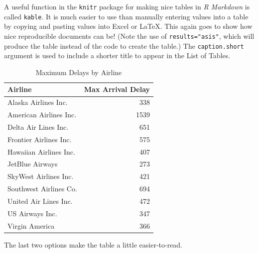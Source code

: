 \documentclass[12pt,twoside]{reedthesis}
\theoremstyle{definition}
\theoremstyle{definition}
\theoremstyle{remark}
\begin{document}
  A useful function in the \texttt{knitr} package for making nice tables
  in \emph{R Markdown} is called \texttt{kable}. It is much easier to use
  than manually entering values into a table by copying and pasting values
  into Excel or LaTeX. This again goes to show how nice reproducible
  documents can be! (Note the use of \texttt{results="asis"}, which will
  produce the table instead of the code to create the table.) The
  \texttt{caption.short} argument is used to include a shorter title to
  appear in the List of Tables.
  
  \begin{Shaded}
  \begin{Highlighting}[]
         \NormalTok{(}\NormalTok{, }\NormalTok{),}
         \NormalTok{,}
         \NormalTok{,}
         \NormalTok{,}
         \NormalTok{)}
  \end{Highlighting}
  \end{Shaded}
  
  \begin{longtable}[t]{lr}
  \caption[Max Delays by Airline]{\label{tab:maxdelays}Maximum Delays by Airline}\\
  \toprule
  Airline & Max Arrival Delay\\
  \midrule
  Alaska Airlines Inc. & 338\\
  American Airlines Inc. & 1539\\
  Delta Air Lines Inc. & 651\\
  Frontier Airlines Inc. & 575\\
  Hawaiian Airlines Inc. & 407\\
  \addlinespace
  JetBlue Airways & 273\\
  SkyWest Airlines Inc. & 421\\
  Southwest Airlines Co. & 694\\
  United Air Lines Inc. & 472\\
  US Airways Inc. & 347\\
  Virgin America & 366\\
  \bottomrule
  \end{longtable}
  
  The last two options make the table a little easier-to-read.
  
\end{document}

